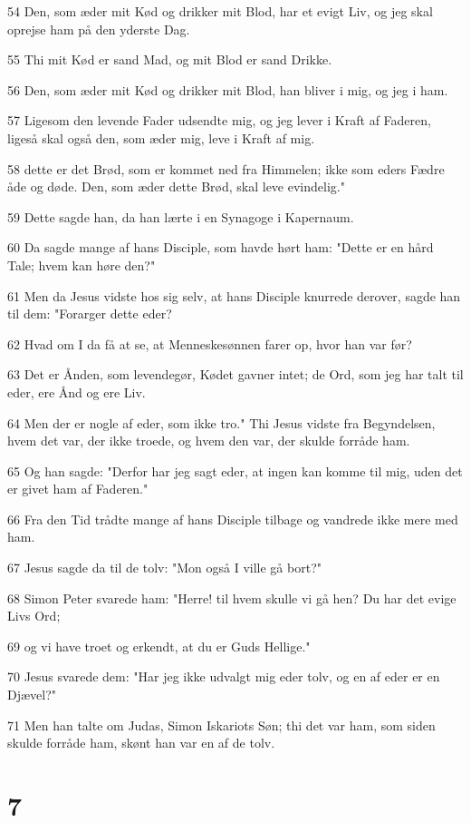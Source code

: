 \par 54 Den, som æder mit Kød og drikker mit Blod, har et evigt Liv, og jeg skal oprejse ham på den yderste Dag.
\par 55 Thi mit Kød er sand Mad, og mit Blod er sand Drikke.
\par 56 Den, som æder mit Kød og drikker mit Blod, han bliver i mig, og jeg i ham.
\par 57 Ligesom den levende Fader udsendte mig, og jeg lever i Kraft af Faderen, ligeså skal også den, som æder mig, leve i Kraft af mig.
\par 58 dette er det Brød, som er kommet ned fra Himmelen; ikke som eders Fædre åde og døde. Den, som æder dette Brød, skal leve evindelig."
\par 59 Dette sagde han, da han lærte i en Synagoge i Kapernaum.
\par 60 Da sagde mange af hans Disciple, som havde hørt ham: "Dette er en hård Tale; hvem kan høre den?"
\par 61 Men da Jesus vidste hos sig selv, at hans Disciple knurrede derover, sagde han til dem: "Forarger dette eder?
\par 62 Hvad om I da få at se, at Menneskesønnen farer op, hvor han var før?
\par 63 Det er Ånden, som levendegør, Kødet gavner intet; de Ord, som jeg har talt til eder, ere Ånd og ere Liv.
\par 64 Men der er nogle af eder, som ikke tro." Thi Jesus vidste fra Begyndelsen, hvem det var, der ikke troede, og hvem den var, der skulde forråde ham.
\par 65 Og han sagde: "Derfor har jeg sagt eder, at ingen kan komme til mig, uden det er givet ham af Faderen."
\par 66 Fra den Tid trådte mange af hans Disciple tilbage og vandrede ikke mere med ham.
\par 67 Jesus sagde da til de tolv: "Mon også I ville gå bort?"
\par 68 Simon Peter svarede ham: "Herre! til hvem skulle vi gå hen? Du har det evige Livs Ord;
\par 69 og vi have troet og erkendt, at du er Guds Hellige."
\par 70 Jesus svarede dem: "Har jeg ikke udvalgt mig eder tolv, og en af eder er en Djævel?"
\par 71 Men han talte om Judas, Simon Iskariots Søn; thi det var ham, som siden skulde forråde ham, skønt han var en af de tolv.

\chapter{7}

